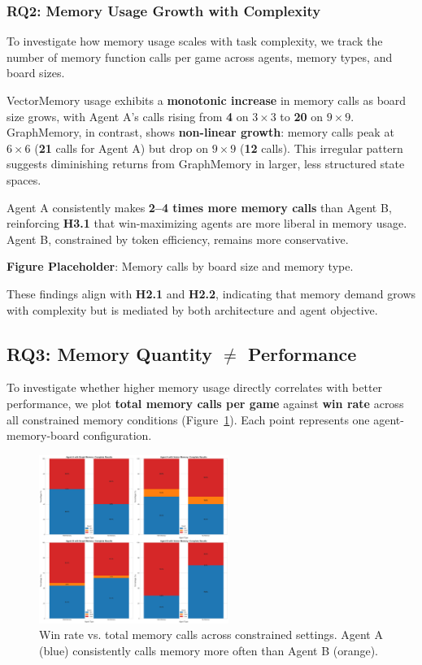 \documentclass[10pt]{article}
\begin{document}
\subsubsection{RQ2: Memory Usage Growth with Complexity}

To investigate how memory usage scales with task complexity, we track the number of memory function calls per game across agents, memory types, and board sizes.

VectorMemory usage exhibits a \textbf{monotonic increase} in memory calls as board size grows, with Agent A's calls rising from \textbf{4} on $3\times3$ to \textbf{20} on $9\times9$. GraphMemory, in contrast, shows \textbf{non-linear growth}: memory calls peak at $6\times6$ (\textbf{21} calls for Agent A) but drop on $9\times9$ (\textbf{12} calls). This irregular pattern suggests diminishing returns from GraphMemory in larger, less structured state spaces.

Agent A consistently makes \textbf{2--4 times more memory calls} than Agent B, reinforcing \textbf{H3.1} that win-maximizing agents are more liberal in memory usage. Agent B, constrained by token efficiency, remains more conservative.

\textbf{Figure Placeholder}: Memory calls by board size and memory type.

These findings align with \textbf{H2.1} and \textbf{H2.2}, indicating that memory demand grows with complexity but is mediated by both architecture and agent objective.

\subsection{RQ3: Memory Quantity $\neq$ Performance}

To investigate whether higher memory usage directly correlates with better performance, we plot \textbf{total memory calls per game} against \textbf{win rate} across all constrained memory conditions (Figure~\ref{fig:memory_quantity_performance}). Each point represents one agent-memory-board configuration.

\begin{figure}[ht]
\centering
\includegraphics[width=0.55\textwidth]{figures/memory_baseline/memory_complete_results.png}
\caption{Win rate vs. total memory calls across constrained settings. Agent A (blue) consistently calls memory more often than Agent B (orange).}
\label{fig:memory_quantity_performance}
\end{figure}
\end{document}

